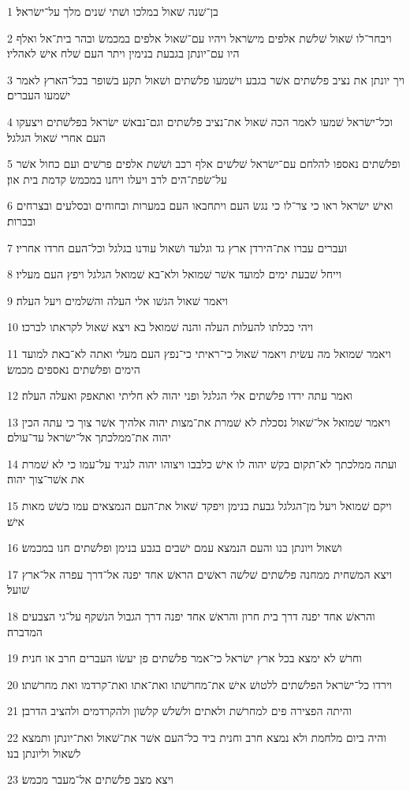 \par 1 בן־שׁנה שׁאול במלכו ושׁתי שׁנים מלך על־ישׂראל׃
\par 2 ויבחר־לו שׁאול שׁלשׁת אלפים מישׂראל ויהיו עם־שׁאול אלפים במכמשׂ ובהר בית־אל ואלף היו עם־יונתן בגבעת בנימין ויתר העם שׁלח אישׁ לאהליו׃
\par 3 ויך יונתן את נציב פלשׁתים אשׁר בגבע וישׁמעו פלשׁתים ושׁאול תקע בשׁופר בכל־הארץ לאמר ישׁמעו העברים׃
\par 4 וכל־ישׂראל שׁמעו לאמר הכה שׁאול את־נציב פלשׁתים וגם־נבאשׁ ישׂראל בפלשׁתים ויצעקו העם אחרי שׁאול הגלגל׃
\par 5 ופלשׁתים נאספו להלחם עם־ישׂראל שׁלשׁים אלף רכב ושׁשׁת אלפים פרשׁים ועם כחול אשׁר על־שׂפת־הים לרב ויעלו ויחנו במכמשׂ קדמת בית און׃
\par 6 ואישׁ ישׂראל ראו כי צר־לו כי נגשׂ העם ויתחבאו העם במערות ובחוחים ובסלעים ובצרחים ובברות׃
\par 7 ועברים עברו את־הירדן ארץ גד וגלעד ושׁאול עודנו בגלגל וכל־העם חרדו אחריו׃
\par 8 וייחל שׁבעת ימים למועד אשׁר שׁמואל ולא־בא שׁמואל הגלגל ויפץ העם מעליו׃
\par 9 ויאמר שׁאול הגשׁו אלי העלה והשׁלמים ויעל העלה׃
\par 10 ויהי ככלתו להעלות העלה והנה שׁמואל בא ויצא שׁאול לקראתו לברכו׃
\par 11 ויאמר שׁמואל מה עשׂית ויאמר שׁאול כי־ראיתי כי־נפץ העם מעלי ואתה לא־באת למועד הימים ופלשׁתים נאספים מכמשׂ׃
\par 12 ואמר עתה ירדו פלשׁתים אלי הגלגל ופני יהוה לא חליתי ואתאפק ואעלה העלה׃
\par 13 ויאמר שׁמואל אל־שׁאול נסכלת לא שׁמרת את־מצות יהוה אלהיך אשׁר צוך כי עתה הכין יהוה את־ממלכתך אל־ישׂראל עד־עולם׃
\par 14 ועתה ממלכתך לא־תקום בקשׁ יהוה לו אישׁ כלבבו ויצוהו יהוה לנגיד על־עמו כי לא שׁמרת את אשׁר־צוך יהוה׃
\par 15 ויקם שׁמואל ויעל מן־הגלגל גבעת בנימן ויפקד שׁאול את־העם הנמצאים עמו כשׁשׁ מאות אישׁ׃
\par 16 ושׁאול ויונתן בנו והעם הנמצא עמם ישׁבים בגבע בנימן ופלשׁתים חנו במכמשׂ׃
\par 17 ויצא המשׁחית ממחנה פלשׁתים שׁלשׁה ראשׁים הראשׁ אחד יפנה אל־דרך עפרה אל־ארץ שׁועל׃
\par 18 והראשׁ אחד יפנה דרך בית חרון והראשׁ אחד יפנה דרך הגבול הנשׁקף על־גי הצבעים המדברה׃
\par 19 וחרשׁ לא ימצא בכל ארץ ישׂראל כי־אמר פלשׁתים פן יעשׂו העברים חרב או חנית׃
\par 20 וירדו כל־ישׂראל הפלשׁתים ללטושׁ אישׁ את־מחרשׁתו ואת־אתו ואת־קרדמו ואת מחרשׁתו׃
\par 21 והיתה הפצירה פים למחרשׁת ולאתים ולשׁלשׁ קלשׁון ולהקרדמים ולהציב הדרבן׃
\par 22 והיה ביום מלחמת ולא נמצא חרב וחנית ביד כל־העם אשׁר את־שׁאול ואת־יונתן ותמצא לשׁאול וליונתן בנו׃
\par 23 ויצא מצב פלשׁתים אל־מעבר מכמשׂ׃

